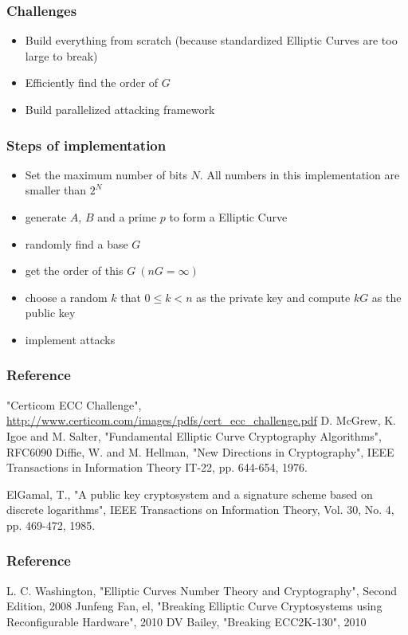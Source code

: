 \documentclass{beamer}
\begin{document}
  \begin{frame}
	\frametitle{Challenges}
	\begin{itemize}
		\item Build everything from scratch (because standardized Elliptic Curves are too large to break)\\
		\item Efficiently find the order of $G$\\
		\item Build parallelized attacking framework
	\end{itemize}	  
  \end{frame}
  
  \begin{frame}
  	\frametitle{Steps of implementation}
  	\begin{itemize}
  		\item Set the maximum number of bits $N$. All numbers in this implementation are smaller than $2^N$ \\
  		\item generate $A$, $B$ and a prime $p$ to form a Elliptic Curve\\
  		\item randomly find a base $G$\\
  		\item \alert{get the order of this $G\ (nG = \infty)$}\\
  		\item choose a random $k$ that $0 \leq k < n$ as the private key and compute $kG$ as the public key\\
  		\item implement attacks	
  	\end{itemize}
  \end{frame}
  
  \begin{thebibliography}{}
  	\begin{frame}
  	\frametitle{Reference}
	 "Certicom ECC Challenge", \url{http://www.certicom.com/images/pdfs/cert_ecc_challenge.pdf}
	 D. McGrew, K. Igoe and M. Salter, "Fundamental Elliptic Curve Cryptography Algorithms", RFC6090
     Diffie, W. and M. Hellman, "New Directions in
                Cryptography", IEEE Transactions in Information
                Theory IT-22, pp. 644-654, 1976.

     ElGamal, T., "A public key cryptosystem and a signature
                scheme based on discrete logarithms", IEEE Transactions
                on Information Theory, Vol. 30, No. 4, pp. 469-472,
                1985.
  	\end{frame}
  
  	\begin{frame}
  	\frametitle{Reference}
	 L. C. Washington, "Elliptic Curves Number Theory and Cryptography", Second Edition, 2008
  	 Junfeng Fan, el, "Breaking Elliptic Curve Cryptosystems using
Reconfigurable Hardware", 2010
	 DV Bailey, "Breaking ECC2K-130", 2010  
	\end{frame}
  \end{thebibliography}
\end{document}
